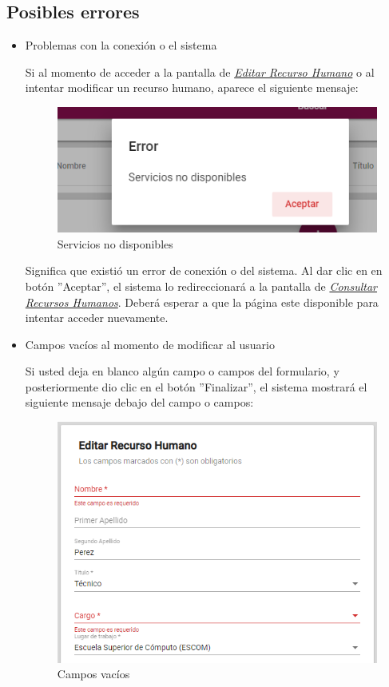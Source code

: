                 \subsection{Posibles errores}
                    \begin{itemize}
                        \item Problemas con la conexión o el sistema

                            Si al momento de acceder a la pantalla de \hyperlink{editarRH}{\textit{Editar Recurso Humano}} o al intentar modificar un recurso humano, aparece el siguiente mensaje:
                            \clearpage
                            \begin{figure}[H]
                                \centering
                                \includegraphics[width=0.4\linewidth]{images/SP1/MSGSN}
                                \caption{Servicios no disponibles}

                            \end{figure}


                            Significa que existió un error de conexión o del sistema. Al dar clic en en botón ''Aceptar'', el sistema lo redireccionará  a la pantalla de \hyperlink{consultarRH}{\textit{Consultar Recursos Humanos}}. Deberá esperar a que la página este disponible para intentar acceder nuevamente.

                        \item Campos vacíos al momento de modificar al usuario

                            Si usted deja en blanco algún campo o campos del formulario, y posteriormente dio clic en el botón ''Finalizar'', el sistema mostrará el siguiente mensaje debajo del campo o campos:

                          \begin{figure}[H]
                            \centering
                            \includegraphics[width=0.4\linewidth]{images/SP1/MSG44-1}
                            \caption{Campos vacíos}
                            \label{mensaje44}


\end{figure}
\end{itemize}

